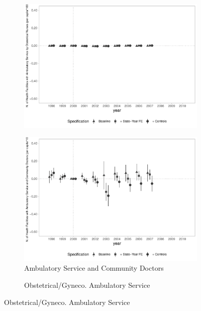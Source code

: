 \begin{figure}[h]
\begin{center}
\begin{subfigure}{0.24\textwidth}
        \includegraphics[width=\textwidth]{plots/infra/sia_ncnes_enfobs_mun_pcapita_dist_ec29_baseline_dist_ec29_baseline_full.pdf}
    \end{subfigure}
    \begin{subfigure}{0.24\textwidth}
        \centering
        \caption{\tiny Ambulatory Service and Community Doctors}\label{fig:infra_h}
        \includegraphics[width=\textwidth]{plots/infra/sia_ncnes_medcom_pcapita_dist_ec29_baseline_dist_ec29_baseline_full.pdf}
    \end{subfigure}
    \begin{subfigure}{0.24\textwidth}
        \centering
        \caption{\tiny Obstetrical/Gyneco. Ambulatory Service}\label{fig:infra_i}

\end{subfigure}
\end{center}
\end{figure}
